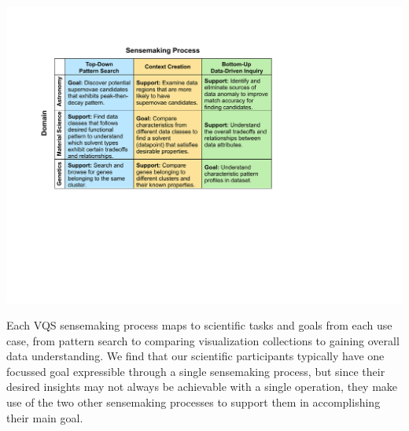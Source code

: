 \begin{table}[h!]
	\centering
	\includegraphics[width=\linewidth]{figures/science_task.pdf}
	\vspace{-6pt}\caption{Each VQS sensemaking process maps to scientific tasks and goals from each use case, from pattern search to comparing visualization collections to gaining overall data understanding. We find that our scientific participants typically have one focussed goal expressible through a single sensemaking process, but since their desired insights may not always be achievable with a single operation, they make use of the two other sensemaking processes to support them in accomplishing their main goal.}
	\label{science_task}
	\vspace{-10pt}
\end{table}
